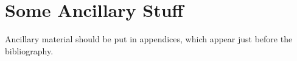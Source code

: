 \documentclass{gatech-thesis}
\begin{document}
\appendix
\chapter{Some Ancillary Stuff}

Ancillary material should be put in appendices, which 
appear just before the bibliography. 

\begin{postliminary}
{}

\begin{vita}

\end{vita}
\end{postliminary}
\end{document}
